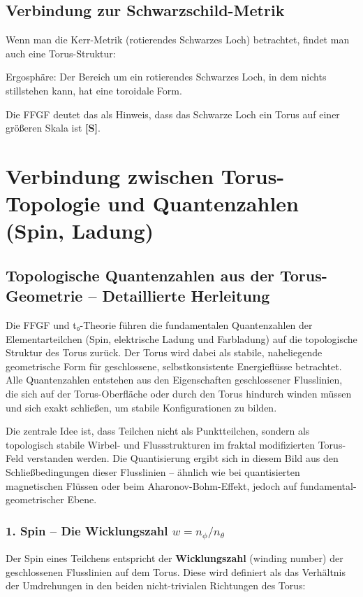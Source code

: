 	\subsection{Verbindung zur Schwarzschild-Metrik}
	Wenn man die Kerr-Metrik (rotierendes Schwarzes Loch) betrachtet, findet man auch eine Torus-Struktur:
	
	Ergosphäre: Der Bereich um ein rotierendes Schwarzes Loch, in dem nichts stillstehen kann, hat eine toroidale Form.
	
	Die FFGF deutet das als Hinweis, dass das Schwarze Loch ein Torus auf einer größeren Skala ist \textbf{[S]}.
	
	\section{Verbindung zwischen Torus-Topologie und Quantenzahlen (Spin, Ladung)}
	
	\subsection{Topologische Quantenzahlen aus der Torus-Geometrie – Detaillierte Herleitung}
	
	Die FFGF und t₀-Theorie führen die fundamentalen Quantenzahlen der Elementarteilchen (Spin, elektrische Ladung und Farbladung) auf die topologische Struktur des Torus zurück. Der Torus wird dabei als stabile, naheliegende geometrische Form für geschlossene, selbstkonsistente Energieflüsse betrachtet. Alle Quantenzahlen entstehen aus den Eigenschaften geschlossener Flusslinien, die sich auf der Torus-Oberfläche oder durch den Torus hindurch winden müssen und sich exakt schließen, um stabile Konfigurationen zu bilden.
	
	Die zentrale Idee ist, dass Teilchen nicht als Punktteilchen, sondern als topologisch stabile Wirbel- und Flussstrukturen im fraktal modifizierten Torus-Feld verstanden werden. Die Quantisierung ergibt sich in diesem Bild aus den Schließbedingungen dieser Flusslinien – ähnlich wie bei quantisierten magnetischen Flüssen oder beim Aharonov-Bohm-Effekt, jedoch auf fundamental-geometrischer Ebene.
	
	\subsubsection{1. Spin – Die Wicklungszahl $w = n_\phi / n_\theta$}
	
	Der Spin eines Teilchens entspricht der \textbf{Wicklungszahl} (winding number) der geschlossenen Flusslinien auf dem Torus. Diese wird definiert als das Verhältnis der Umdrehungen in den beiden nicht-trivialen Richtungen des Torus:
	
